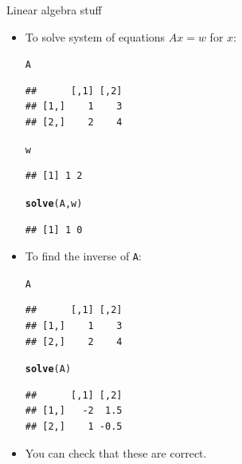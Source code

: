 \documentclass[unknownkeysallowed]{beamer}\usepackage[]{graphicx}\usepackage[]{color}
\makeatletter
\newcommand{\hlstd}[1]{\textcolor[rgb]{0.345,0.345,0.345}{#1}}%
\newcommand{\hlkwd}[1]{\textcolor[rgb]{0.737,0.353,0.396}{\textbf{#1}}}%
\newenvironment{kframe}{%
 \def\at@end@of@kframe{}%
 \ifinner\ifhmode%
  \def\at@end@of@kframe{\end{minipage}}%
  \begin{minipage}{\columnwidth}%
 \fi\fi%
 \def\FrameCommand##1{\hskip\@totalleftmargin \hskip-\fboxsep
 \colorbox{shadecolor}{##1}\hskip-\fboxsep
     \hskip-\linewidth \hskip-\@totalleftmargin \hskip\columnwidth}%
 \MakeFramed {\advance\hsize-\width
   \@totalleftmargin\z@ \linewidth\hsize
   \@setminipage}}%
 {\par\unskip\endMakeFramed%
 \at@end@of@kframe}
\newenvironment{knitrout}{}{} %
\makeatother
\begin{document}
\begin{frame}[fragile]{Linear algebra stuff}

\begin{multicols}{2}
  \begin{itemize}
  \item To solve system of equations $Ax=w$ for $x$:
\begin{knitrout}
\color{fgcolor}\begin{kframe}
\begin{alltt}
\hlstd{A}
\end{alltt}
\begin{verbatim}
##      [,1] [,2]
## [1,]    1    3
## [2,]    2    4
\end{verbatim}
\begin{alltt}
\hlstd{w}
\end{alltt}
\begin{verbatim}
## [1] 1 2
\end{verbatim}
\begin{alltt}
\hlkwd{solve}\hlstd{(A,w)}
\end{alltt}
\begin{verbatim}
## [1] 1 0
\end{verbatim}
\end{kframe}
\end{knitrout}

\columnbreak

\item To find the inverse of \texttt{A}:
\begin{knitrout}
\color{fgcolor}\begin{kframe}
\begin{alltt}
\hlstd{A}
\end{alltt}
\begin{verbatim}
##      [,1] [,2]
## [1,]    1    3
## [2,]    2    4
\end{verbatim}
\begin{alltt}
\hlkwd{solve}\hlstd{(A)}
\end{alltt}
\begin{verbatim}
##      [,1] [,2]
## [1,]   -2  1.5
## [2,]    1 -0.5
\end{verbatim}
\end{kframe}
\end{knitrout}
\item You can check that these are correct.
  \end{itemize}
\end{multicols}
  
\end{frame}
\end{document}
